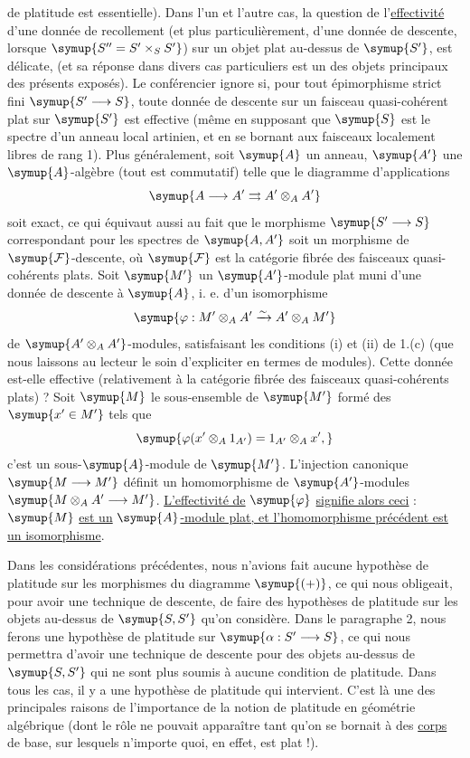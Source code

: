 de platitude est essentielle). Dans l'un et l'autre cas, la question de
l'\uline{effectivité} d'une donnée de recollement (et plus particulièrement, d'une
donnée de descente, lorsque $\symup{S''=S'\times_SS'}$) sur un objet plat au-dessus de
$\symup{S'}$, est délicate, (et sa réponse dans divers cas particuliers est un des objets
principaux des présents exposés). Le conférencier ignore si, pour tout
épimorphisme strict fini $\symup{S'\longrightarrow S}$, toute donnée de descente sur un
faisceau quasi-cohérent plat sur $\symup{S'}$ est effective (même en supposant que $\symup{S}$
est le spectre d'un anneau local artinien, et en se bornant aux faisceaux
localement libres de rang 1). Plus généralement, soit $\symup{A}$ un anneau, $\symup{A'}$ une
$\symup{A}$-algèbre (tout est commutatif) telle que le diagramme d'applications
\[
  \symup{A\longrightarrow A'\rightrightarrows A'\otimes_AA'}
\]
soit exact, ce qui équivaut aussi au fait que le morphisme
$\symup{S'\longrightarrow S}$ correspondant pour les spectres de $\symup{A,A'}$ soit un
morphisme de $\symup{\mathcal F}$-descente, où $\symup{\mathcal F}$ est la catégorie fibrée des
faisceaux quasi-cohérents plats. Soit $\symup{M'}$ un $\symup{A'}$-module plat muni d'une donnée
de descente à $\symup{A}$, i. e. d'un isomorphisme
\[
  \symup{\varphi:M'\otimes_AA'\xrightarrow{\sim}A'\otimes_AM'}
\]
de $\symup{A'\otimes_AA'}$-modules, satisfaisant les conditions (i) et (ii) de 1.(c) (que
nous laissons au lecteur le soin d'expliciter en termes de modules). Cette
donnée est-elle effective (relativement à la catégorie fibrée des faisceaux
quasi-cohérents plats) ? Soit $\symup{M}$ le sous-ensemble de $\symup{M'}$ formé des $\symup{x'\in M'}$
tels que
\[
  \symup{\varphi(x'\otimes_A1_{A'})=1_{A'}\otimes_Ax',}
\]
c'est un sous-$\symup{A}$-module de $\symup{M'}$. L'injection canonique
$\symup{M\longrightarrow M'}$ définit un homomorphisme de $\symup{A'}$-modules
$\symup{M\otimes_AA'\longrightarrow M'}$. \uline{L'effectivité de} $\symup{\varphi}$ \uline{signifie alors
ceci} : $\symup{M}$ \uline{est un} $\symup{A}$\uline{-module plat, et l'homomorphisme précédent est un
isomorphisme}.

 Dans les considérations précédentes, nous n'avions fait
aucune hypothèse de platitude sur les morphismes du diagramme $\symup{(+)}$, ce qui nous
obligeait, pour avoir une technique de descente, de faire des hypothèses de
platitude sur les objets au-dessus de $\symup{S,S'}$ qu'on considère. Dans le paragraphe
2, nous ferons une hypothèse de platitude sur $\symup{\alpha:S'\longrightarrow S}$, ce
qui nous permettra d'avoir une technique de descente pour des objets au-dessus
de $\symup{S,S'}$ qui ne sont plus soumis à aucune condition de platitude. Dans tous
les cas, il y a une hypothèse de platitude qui intervient. C'est là une des
principales raisons de l'importance de la notion de platitude en géométrie
algébrique (dont le rôle ne pouvait apparaître tant qu'on se bornait à des
\uline{corps} de base, sur lesquels n'importe quoi, en effet, est plat !).

